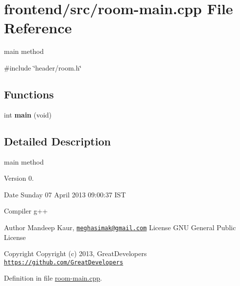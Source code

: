 \hypertarget{room-main_8cpp}{\section{frontend/src/room-\/main.cpp \-File \-Reference}
\label{d9/df0/room-main_8cpp}
}


main method  


{\ttfamily \#include \char`\"{}header/room.\-h\char`\"{}}\*
\subsection*{\-Functions}
\begin{DoxyCompactItemize}
\item 
\hypertarget{room-main_8cpp_a840291bc02cba5474a4cb46a9b9566fe}{int {\bfseries main} (void)}\label{d9/df0/room-main_8cpp_a840291bc02cba5474a4cb46a9b9566fe}

\end{DoxyCompactItemize}


\subsection{\-Detailed \-Description}
main method \begin{DoxyVersion}{\-Version}
0. 
\end{DoxyVersion}
\begin{DoxyDate}{\-Date}
\-Sunday 07 \-April 2013 09\-:00\-:37 \-I\-S\-T\par
 \-Compiler g++
\end{DoxyDate}
\begin{DoxyAuthor}{\-Author}
\-Mandeep \-Kaur, \href{mailto:meghasimak@gmail.com}{\tt meghasimak@gmail.\-com} \-License \-G\-N\-U \-General \-Public \-License 
\end{DoxyAuthor}
\begin{DoxyCopyright}{\-Copyright}
\-Copyright (c) 2013, \-Great\-Developers \href{https://github.com/GreatDevelopers}{\tt https\-://github.\-com/\-Great\-Developers} 
\end{DoxyCopyright}


\-Definition in file \hyperlink{room-main_8cpp_source}{room-\/main.\-cpp}.

